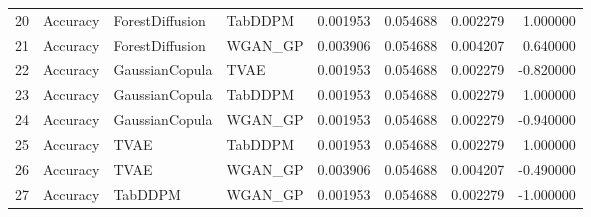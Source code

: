 \begin{tabular}{llllrrrr}
20 & Accuracy & ForestDiffusion & TabDDPM & 0.001953 & 0.054688 & 0.002279 & 1.000000 \\
21 & Accuracy & ForestDiffusion & WGAN_GP & 0.003906 & 0.054688 & 0.004207 & 0.640000 \\
22 & Accuracy & GaussianCopula & TVAE & 0.001953 & 0.054688 & 0.002279 & -0.820000 \\
23 & Accuracy & GaussianCopula & TabDDPM & 0.001953 & 0.054688 & 0.002279 & 1.000000 \\
24 & Accuracy & GaussianCopula & WGAN_GP & 0.001953 & 0.054688 & 0.002279 & -0.940000 \\
25 & Accuracy & TVAE & TabDDPM & 0.001953 & 0.054688 & 0.002279 & 1.000000 \\
26 & Accuracy & TVAE & WGAN_GP & 0.003906 & 0.054688 & 0.004207 & -0.490000 \\
27 & Accuracy & TabDDPM & WGAN_GP & 0.001953 & 0.054688 & 0.002279 & -1.000000 \\
\bottomrule
\end{tabular}

